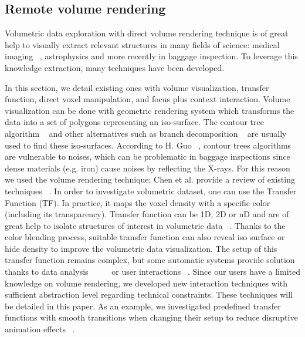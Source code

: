 \subsection{ Remote volume rendering}

Volumetric data exploration with direct volume rendering technique is of great help to visually extract relevant structures in many fields of science: medical imaging ~\cite{ljung_full_2006}, astrophysics and more recently in baggage inspection. To leverage this knowledge extraction, many techniques have been developed. 

In this section, we detail existing ones with volume visualization, transfer function, direct voxel manipulation, and focus plus context interaction.
Volume visualization can be done with geometric rendering system which transforms the data into a set of polygons representing an iso-surface. The contour tree algorithm ~\cite{carr_computing_2000} and other alternatives such as branch decomposition ~\cite{pascucci_multi-resolution_2004} are usually used to find these iso-surfaces. According to H. Guo ~\cite{guo_local_2013}, contour trees algorithms are vulnerable to noises, which can be problematic in baggage inspections since dense materials (e.g. iron) cause noises by reflecting the X-rays. For this reason we used the volume rendering technique; Chen et al. provide a review of existing techniques ~\cite{chen_3-d_2000}.
In order to investigate volumetric dataset, one can use the Transfer Function (TF). In practice, it maps the voxel density with a specific color (including its transparency). Transfer function can be 1D, 2D or nD and are of great help to isolate structures of interest in volumetric data ~\cite{kniss_multidimensional_2002}. Thanks to the color blending process, suitable transfer function can also reveal iso surface or hide density to improve the volumetric data visualization. The setup of this transfer function remains complex, but some automatic systems provide solution thanks to data analysis ~\cite{correa_size-based_2008} ~\cite{sereda_visualization_2006} ~\cite{patel_moment_2009} or user interactions ~\cite{guo_wysiwyg_2011}. Since our users have a limited knowledge on volume rendering, we developed new interaction techniques with sufficient abstraction level regarding technical constraints. These techniques will be detailed in this paper. As an example, we investigated predefined transfer functions with smooth transitions when changing their setup to reduce disruptive animation effects ~\cite{tversky_animation:_2002}.

